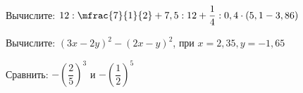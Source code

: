 %
%
%
%
%
%
%
%
%
%
%
%
%
%
%
%
%
%
%
\begin{homework}[number=1]
	\begin{listofex}
		\item Вычислите: \(12:\mfrac{7}{1}{2}+7,5:12+\dfrac{1}{4}:0,4\cdot(5,1-3,86)\)
		\item Вычислите: \((3x-2y)^2-(2x-y)^2\), при \(x=2,35, y=-1,65\)
		\item Сравнить: \(- \left( \dfrac{2}{5} \right)^3\) и \(- \left( \dfrac{1}{2} \right)^5\)
	\end{listofex}
\end{homework}
